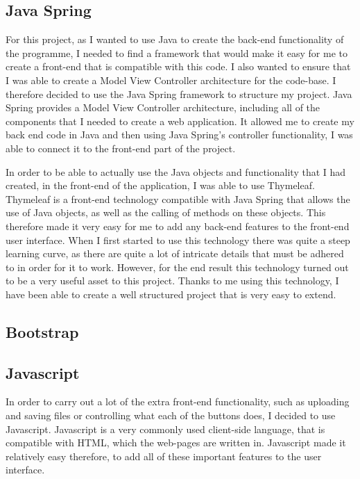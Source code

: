 \subsection{Java Spring \label{JavaSpring}}

For this project, as I wanted to use Java to create the back-end functionality of the programme, I needed to find a framework that would make it easy for me to create a front-end that is compatible with this code. I also wanted to ensure that I was able to create a Model View Controller architecture for the code-base. I therefore decided to use the Java Spring framework to structure my project. Java Spring provides a Model View Controller architecture, including all of the components that I needed to create a web application. It allowed me to create my back end code in Java and then using Java Spring's controller functionality, I was able to connect it to the front-end part of the project. 

In order to be able to actually use the Java objects and functionality that I had created, in the front-end of the application, I was able to use Thymeleaf. Thymeleaf is a front-end technology compatible with Java Spring that allows the use of Java objects, as well as the calling of methods on these objects. This therefore made it very easy for me to add any back-end features to the front-end user interface. When I first started to use this technology there was quite a steep learning curve, as there are quite a lot of intricate details that must be adhered to in order for it to work. However, for the end result this technology turned out to be a very useful asset to this project. Thanks to me using this technology, I have been able to create a well structured project that is very easy to extend.

\subsection{Bootstrap}

\subsection{Javascript}

In order to carry out a lot of the extra front-end functionality, such as uploading and saving files or controlling what each of the buttons does, I decided to use Javascript. Javascript is a very commonly used client-side language, that is compatible with HTML, which the web-pages are written in. Javascript made it relatively easy therefore, to add all of these important features to the user interface. 

